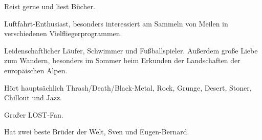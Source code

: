 

\begin{cventries}

\cvaboutme
    {} %
    {} %
    {} %
    {} %
{
  \begin{cvitems} %
    \item {Reist gerne und liest Bücher.}
    \item {Luftfahrt-Enthusiast, besonders interessiert am Sammeln von Meilen in verschiedenen Vielfliegerprogrammen.}
    \item {Leidenschaftlicher Läufer, Schwimmer und Fußballspieler. Außerdem große Liebe zum Wandern, besonders im Sommer beim Erkunden der Landschaften der europäischen Alpen.}
    \item {Hört hauptsächlich Thrash/Death/Black-Metal, Rock, Grunge, Desert, Stoner, Chillout und Jazz.}
     \item {Großer LOST-Fan.}
      \item {Hat zwei beste Brüder der Welt, Sven und Eugen-Bernard.} 
  \end{cvitems}
}


\end{cventries}
